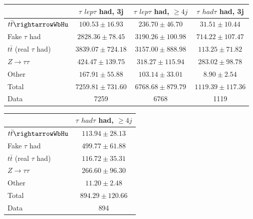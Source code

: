 \begin{table}
\begin{center}
  \begin{tabular}{ | l |  c |  c |  c | }
    \hline \hline 
     &  $\tau$ ${lep}\tau$ {had}, 3j  &  $\tau$ ${lep}\tau$ {had}, $\geq4j$  &  $\tau$ ${had}\tau$ {had}, 3j  \\ 
    \hline 
     $t\bar{t}\rightarrowWbHu$  &   $ 100.53 \pm 16.93 $ &   $ 236.70 \pm 46.70 $ &   $ 31.51 \pm 10.44 $ \\ 
     Fake $\tau$ {had}  &   $ 2828.36 \pm 78.45 $ &   $ 3190.26 \pm 100.98 $ &   $ 714.22 \pm 107.47 $ \\ 
     $t\bar{t}$ (real $\tau$ {had})  &   $ 3839.07 \pm 724.18 $ &   $ 3157.00 \pm 888.98 $ &   $ 113.25 \pm 71.82 $ \\ 
     $Z\rightarrow\tau\tau$  &   $ 424.47 \pm 139.75 $ &   $ 318.27 \pm 115.94 $ &   $ 283.02 \pm 98.78 $ \\ 
    Other  &   $ 167.91 \pm 55.88 $ &   $ 103.14 \pm 33.01 $ &   $ 8.90 \pm 2.54 $ \\ 
    Total  &   $ 7259.81 \pm 731.60 $ &   $ 6768.68 \pm 879.79 $ &   $ 1119.39 \pm 117.36 $ \\ 
    \hline 
    Data  & 7259  & 6768  & 1119  \\ 
    \hline \hline 
  \end{tabular} 


  \begin{tabular}{ | l |  c | }
    \hline \hline 
     &  $\tau$ ${had}\tau$ {had}, $\geq4j$  \\ 
    \hline 
     $t\bar{t}\rightarrowWbHu$  &   $ 113.94 \pm 28.13 $ \\ 
     Fake $\tau$ {had}  &   $ 499.77 \pm 61.88 $ \\ 
     $t\bar{t}$ (real $\tau$ {had})  &   $ 116.72 \pm 35.31 $ \\ 
     $Z\rightarrow\tau\tau$  &   $ 266.60 \pm 96.30 $ \\ 
    Other  &   $ 11.20 \pm 2.48 $ \\ 
    Total  &   $ 894.29 \pm 120.66 $ \\ 
    \hline 
    Data  & 894  \\ 
    \hline \hline 
  \end{tabular} 


\end{center}
\end{table}
